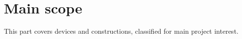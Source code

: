 \section{Main scope}

This part covers devices and constructions, classified for main project interest.

